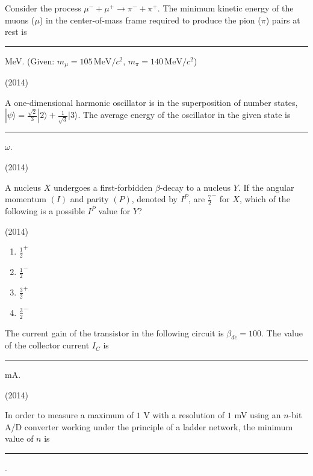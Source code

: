 
    \item Consider the process $\mu^- + \mu^+ \rightarrow \pi^- + \pi^+$. The minimum kinetic energy of the muons ($\mu$) in the center-of-mass frame required to produce the pion ($\pi$) pairs at rest is \rule{1cm}{0.15mm} MeV. (Given: $m_\mu = 105 \, \text{MeV}/c^2$, $m_\pi = 140 \, \text{MeV}/c^2$)
    
    \hfill{(2014)}


    \item A one-dimensional harmonic oscillator is in the superposition of number states, $|\psi\rangle = \frac{\sqrt{2}}{3}|2\rangle + \frac{1}{\sqrt{3}}|3\rangle$. The average energy of the oscillator in the given state is \rule{1cm}{0.15mm} $\omega$.
    
    \hfill{(2014)}

    
    \item A nucleus $X$ undergoes a first-forbidden $\beta$-decay to a nucleus $Y$. If the angular momentum $(I)$ and parity $(P)$, denoted by $I^P$, are $\frac{7}{2}^-$ for $X$, which of the following is a possible $I^P$ value for $Y$?
    
    \hfill{(2014)}
    
    \begin{multicols}{4}
    \begin{enumerate}
        \item $\frac{1}{2}^+$
        \item $\frac{1}{2}^-$
        \item $\frac{3}{2}^+$
        \item $\frac{3}{2}^-$
    \end{enumerate}
    \end{multicols}

        
    \item The current gain of the transistor in the following circuit is $\beta_{dc} = 100$. The value of the collector current $I_C$ is \rule{1cm}{0.15mm} mA.
    
    \hfill{(2014)}

    

    
    \item In order to measure a maximum of $1$ V with a resolution of $1$ mV using an $n$-bit A/D converter working under the principle of a ladder network, the minimum value of $n$ is \rule{1cm}{0.15mm}.
    
